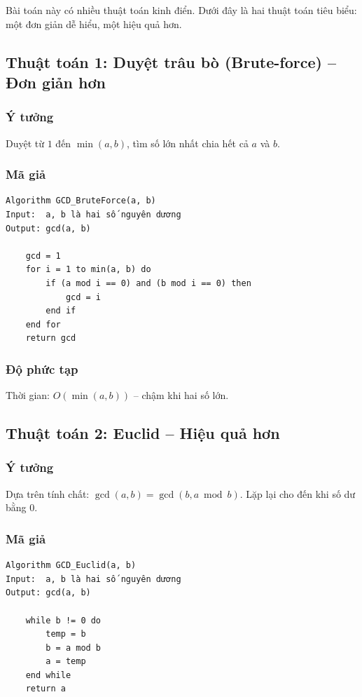 \documentclass[12pt,a4paper]{article}
\begin{document}
Bài toán này có nhiều thuật toán kinh điển. Dưới đây là hai thuật toán tiêu biểu: một đơn giản dễ hiểu, một hiệu quả hơn.

\subsection*{Thuật toán 1: Duyệt trâu bò (Brute-force) – Đơn giản hơn}

\subsubsection*{Ý tưởng}
Duyệt từ $1$ đến $\min(a,b)$, tìm số lớn nhất chia hết cả $a$ và $b$.

\subsubsection*{Mã giả}
\begin{verbatim}
Algorithm GCD_BruteForce(a, b)
Input:  a, b là hai số nguyên dương
Output: gcd(a, b)

    gcd = 1
    for i = 1 to min(a, b) do
        if (a mod i == 0) and (b mod i == 0) then
            gcd = i
        end if
    end for
    return gcd
\end{verbatim}

\subsubsection*{Độ phức tạp}
Thời gian: $O(\min(a,b))$ – chậm khi hai số lớn.

\subsection*{Thuật toán 2: Euclid – Hiệu quả hơn}

\subsubsection*{Ý tưởng}
Dựa trên tính chất: $\gcd(a,b) = \gcd(b, a \bmod b)$. Lặp lại cho đến khi số dư bằng 0.

\subsubsection*{Mã giả}
\begin{verbatim}
Algorithm GCD_Euclid(a, b)
Input:  a, b là hai số nguyên dương
Output: gcd(a, b)

    while b != 0 do
        temp = b
        b = a mod b
        a = temp
    end while
    return a
\end{verbatim}
\end{document}
